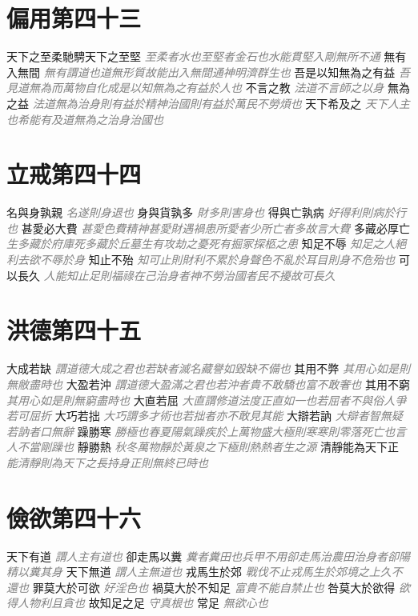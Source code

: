 \documentclass[a4paper,zihao=-4,oneside,landscape,UTF8]{ctexart}
\newcommand{\zhushi}[1]{\scriptsize{\textit{\textcolor{gray}{#1}}}\normalsize}
\begin{document}
\section{偏用第四十三}

天下之至柔馳騁天下之至堅
\zhushi{至柔者水也至堅者金石也水能貫堅入剛無所不通}
無有入無間
\zhushi{無有謂道也道無形質故能出入無間通神明濟群生也}
吾是以知無為之有益
\zhushi{吾見道無為而萬物自化成是以知無為之有益於人也}
不言之教
\zhushi{法道不言師之以身}
無為之益
\zhushi{法道無為治身則有益於精神治國則有益於萬民不勞煩也}
天下希及之
\zhushi{天下人主也希能有及道無為之治身治國也}


\section{立戒第四十四}

名與身孰親
\zhushi{名遂則身退也}
身與貨孰多
\zhushi{財多則害身也}
得與亡孰病
\zhushi{好得利則病於行也}
甚愛必大費
\zhushi{甚愛色費精神甚愛財遇禍患所愛者少所亡者多故言大費}
多藏必厚亡
\zhushi{生多藏於府庫死多藏於丘墓生有攻劫之憂死有掘冢探柩之患}
知足不辱
\zhushi{知足之人絕利去欲不辱於身}
知止不殆
\zhushi{知可止則財利不累於身聲色不亂於耳目則身不危殆也}
可以長久
\zhushi{人能知止足則福祿在己治身者神不勞治國者民不擾故可長久}


\section{洪德第四十五}

大成若缺
\zhushi{謂道德大成之君也若缺者滅名藏譽如毀缺不備也}
其用不弊
\zhushi{其用心如是則無敝盡時也}
大盈若沖
\zhushi{謂道德大盈滿之君也若沖者貴不敢驕也富不敢奢也}
其用不窮
\zhushi{其用心如是則無窮盡時也}
大直若屈
\zhushi{大直謂修道法度正直如一也若屈者不與俗人爭若可屈折}
大巧若拙
\zhushi{大巧謂多才術也若拙者亦不敢見其能}
大辯若訥
\zhushi{大辯者智無疑若訥者口無辭}
躁勝寒
\zhushi{勝極也春夏陽氣躁疾於上萬物盛大極則寒寒則零落死亡也言人不當剛躁也}
靜勝熱
\zhushi{秋冬萬物靜於黃泉之下極則熱熱者生之源}
清靜能為天下正
\zhushi{能清靜則為天下之長持身正則無終已時也}


\section{儉欲第四十六}

天下有道
\zhushi{謂人主有道也}
卻走馬以糞
\zhushi{糞者糞田也兵甲不用卻走馬治農田治身者卻陽精以糞其身}
天下無道
\zhushi{謂人主無道也}
戎馬生於郊
\zhushi{戰伐不止戎馬生於郊境之上久不還也}
罪莫大於可欲
\zhushi{好淫色也}
禍莫大於不知足
\zhushi{富貴不能自禁止也}
咎莫大於欲得
\zhushi{欲得人物利且貪也}
故知足之足
\zhushi{守真根也}
常足
\zhushi{無欲心也}
\end{document}
